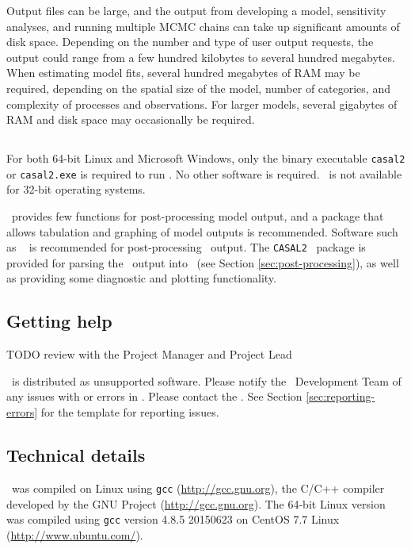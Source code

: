 Output files can be large, and the output from developing a model, sensitivity analyses, and running multiple MCMC chains can take up significant amounts of disk space. Depending on the number and type of user output requests, the output could range from a few hundred kilobytes to several hundred megabytes. When estimating model fits, several hundred megabytes of RAM may be required, depending on the spatial size of the model, number of categories, and complexity of processes and observations. For larger models, several gigabytes of RAM and disk space may occasionally be required. 

\subsection{}

For both 64-bit Linux and Microsoft Windows, only the binary executable \texttt{casal2} or \texttt{casal2.exe} is required to run \CNAME . No other software is required. \CNAME\ is not available for 32-bit operating systems. 

\CNAME\ provides few functions for post-processing model output, and a package that allows tabulation and graphing of model outputs is recommended. Software such as \href{http://www.r-project.org}{\R}\ \citep{R} is recommended for post-processing \CNAME\ output. The \texttt{CASAL2} \R\ package is provided for parsing the \CNAME\ output into \R\ (see Section \ref{sec:post-processing}), as well as providing some diagnostic and plotting functionality.

\subsection{Getting help}

TODO review with the Project Manager and Project Lead

\CNAME\ is distributed as unsupported software. Please notify the \CNAME\ Development Team of any issues with or errors in \CNAME. Please contact the \emaillink. See Section \ref{sec:reporting-errors} for the template for reporting issues.

\subsection{Technical details}\label{sec:tech}

\CNAME\ was compiled on Linux using \texttt{gcc} (\url{http://gcc.gnu.org}), the C/C++ compiler developed by the GNU Project (\url{http://gcc.gnu.org}). The 64-bit Linux  version was compiled using \texttt{gcc} version 4.8.5 20150623 on CentOS 7.7 Linux (\url{http://www.ubuntu.com/}).

